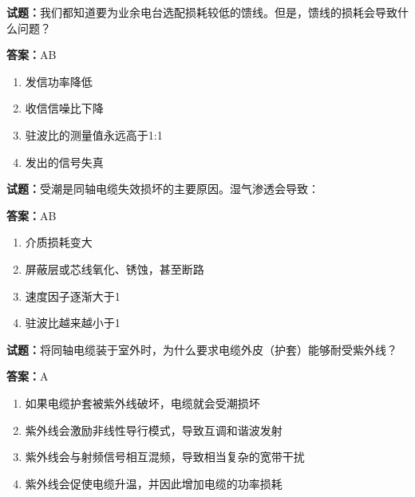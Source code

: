 \documentclass{ctexbook}
\begin{document}




\vspace{1em}

\textbf{试题：}我们都知道要为业余电台选配损耗较低的馈线。但是，馈线的损耗会导致什么问题？ 

\textbf{答案：}AB 

\begin{enumerate}[leftmargin=3em]
  \item 发信功率降低 

  \item 收信信噪比下降 

  \item 驻波比的测量值永远高于1:1 

  \item 发出的信号失真 

\end{enumerate}





\vspace{1em}

\textbf{试题：}受潮是同轴电缆失效损坏的主要原因。湿气渗透会导致： 

\textbf{答案：}AB 

\begin{enumerate}[leftmargin=3em]
  \item 介质损耗变大 

  \item 屏蔽层或芯线氧化、锈蚀，甚至断路 

  \item 速度因子逐渐大于1 

  \item 驻波比越来越小于1 

\end{enumerate}





\vspace{1em}

\textbf{试题：}将同轴电缆装于室外时，为什么要求电缆外皮（护套）能够耐受紫外线？ 

\textbf{答案：}A 

\begin{enumerate}[leftmargin=3em]
  \item 如果电缆护套被紫外线破坏，电缆就会受潮损坏 

  \item 紫外线会激励非线性导行模式，导致互调和谐波发射 

  \item 紫外线会与射频信号相互混频，导致相当复杂的宽带干扰 

  \item 紫外线会促使电缆升温，并因此增加电缆的功率损耗 

\end{enumerate}
\end{document}
